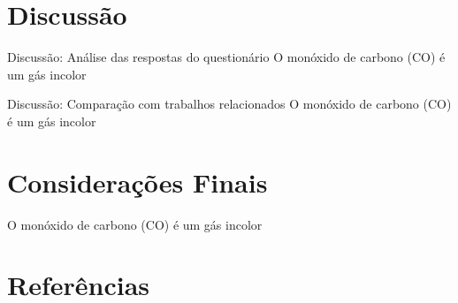 \documentclass[12pt]{beamer}
\begin{document}
    \section{Discussão}

    \begin{frame}{Discussão: Análise das respostas do questionário}
        O monóxido de carbono (CO) é um gás incolor 
    \end{frame}

    \begin{frame}{Discussão: Comparação com trabalhos relacionados}
        O monóxido de carbono (CO) é um gás incolor 
    \end{frame}

    \section{Considerações Finais}

    \begin{frame}
        O monóxido de carbono (CO) é um gás incolor 
    \end{frame}

    \section{Referências}
    
    \printbibliography
\end{document}
